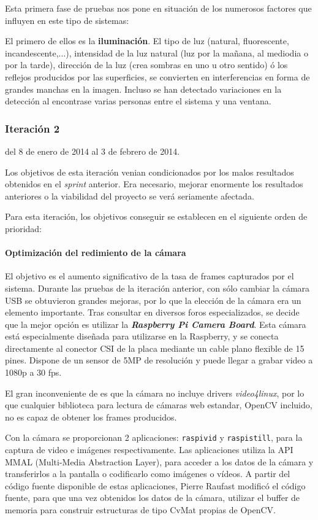 Esta primera fase de pruebas nos pone en situación de los numerosos factores que influyen en este tipo de sistemas:

El primero de ellos es la \textbf{iluminación}. El tipo de luz (natural, fluorescente, incandescente,...), intensidad de la luz natural (luz por la mañana, al mediodia o por la tarde), dirección de la luz (crea sombras en uno u otro sentido) ó los reflejos producidos por las superficies, se convierten en interferencias en forma de grandes manchas en la imagen. Incluso se han detectado variaciones en la detección al encontrase varias personas entre el sistema y una ventana.



\subsubsection{Iteración 2}
del  8 de enero de 2014 al 3 de febrero de 2014.

Los objetivos de esta iteración venian condicionados por los malos resultados obtenidos en el \textit{sprint} anterior. Era necesario, mejorar enormente los resultados anteriores o la viabilidad del proyecto se verá seriamente afectada.

Para esta iteración, los objetivos conseguir se establecen en el siguiente orden de prioridad:

\paragraph{Optimización del redimiento de la cámara} 
El objetivo es el aumento significativo de la tasa de frames capturados por el sistema.
Durante las pruebas de la iteración anterior, con sólo cambiar la cámara USB se obtuvieron grandes mejoras, por lo que la elección de la cámara era un elemento importante. Tras consultar en diversos foros especializados, se decide que la mejor opción es utilizar la \textbf{\textit{Raspberry Pi Camera Board}}. Esta cámara está especialmente diseñada para utilizarse en la Raspberry, y se conecta directamente al conector CSI de la placa mediante un cable plano flexible de 15 pines. Dispone de un sensor de 5MP de resolución y puede llegar a grabar video a 1080p a 30 fps.

El gran inconveniente de es que la cámara no incluye drivers \textit{video4linux}, por lo que cualquier biblioteca para lectura de cámaras web estandar, OpenCV incluido, no es capaz de obtener los frames producidos. 

Con la cámara se proporcionan 2 aplicaciones: \texttt{raspivid} y \texttt{raspistill}, para la captura de video e imágenes respectivamente. Las aplicaciones utiliza la API MMAL (Multi-Media Abstraction Layer), para acceder a los datos de la cámara y transferirlos a la pantalla o codificarlo como imágenes o vídeos. A partir del código fuente disponible de estas aplicaciones, Pierre Raufast modificó el código fuente, para que una vez obtenidos los datos de la cámara, utilizar el buffer de memoria para construir estructuras de tipo CvMat propias de OpenCV.


